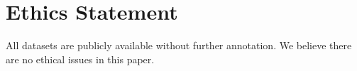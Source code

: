 \section*{Ethics Statement}

All datasets are publicly available without further annotation.
We believe there are no ethical issues in this paper.
